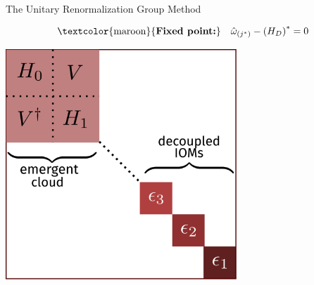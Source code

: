 \documentclass[aspectratio=169]{beamer}
\newcommand{\focus}[1]{\textcolor{maroon}{\textbf{#1}}}
\begin{document}
\begin{frame}[noframenumbering]{The Unitary Renormalization Group Method}
{\begin{minipage}{0.4\textwidth}
\[\text{\focus{Fixed point:}}~ ~ ~\hat \omega_{(j^*)} - \left(H_D\right)^* = 0\]
\end{minipage}
\hspace*{\fill}
\begin{minipage}{0.58\textwidth}
	\centering
	\includegraphics[width=0.65\textwidth]{figures/urg_ham_full.pdf}
\end{minipage}
\vspace*{\fill}
}
\end{frame}
\end{document}
